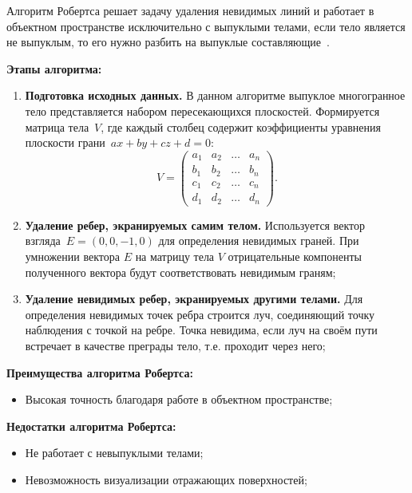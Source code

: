 Алгоритм Робертса решает задачу удаления невидимых линий и работает в объектном пространстве исключительно с выпуклыми телами, если тело является не выпуклым, то его нужно разбить на выпуклые составляющие~\cite{rodgersCG}.

\textbf{Этапы алгоритма:}
\begin{enumerate}[label=\arabic*)]
	\item \textbf{Подготовка исходных данных.} В данном алгоритме выпуклое многогранное тело представляется набором пересекающихся плоскостей. Формируется матрица тела~$V$, где каждый столбец содержит коэффициенты уравнения плоскости грани~$ax + by + cz + d = 0$:
	\begin{equation}
		V = \begin{pmatrix}
			a_{1} & a_{2} & \ldots & a_{n}\\
			b_{1} & b_{2} & \ldots & b_{n}\\
			c_{1} & c_{2} & \ldots & c_{n}\\
			d_{1} & d_{2} & \ldots & d_{n}
		\end{pmatrix}.
	\end{equation}
	\item \textbf{Удаление ребер, экранируемых самим телом.} Используется вектор взгляда~$E = (0, 0, -1, 0)$ для определения невидимых граней. При умножении вектора $E$ на матрицу тела $V$ отрицательные компоненты полученного вектора будут соответствовать невидимым граням;
	
	\item \textbf{Удаление невидимых ребер, экранируемых другими телами.} Для определения невидимых точек ребра строится луч, соединяющий точку наблюдения с точкой на ребре. Точка невидима, если луч на своём пути встречает в качестве преграды тело, т.е. проходит через него;
\end{enumerate}

\textbf{Преимущества алгоритма Робертса:}
\begin{itemize}
	\item Высокая точность благодаря работе в объектном пространстве;
\end{itemize}

\textbf{Недостатки алгоритма Робертса:}
\begin{itemize}
	\item Не работает с невыпуклыми телами;
	\item Невозможность визуализации отражающих поверхностей;
\end{itemize}


